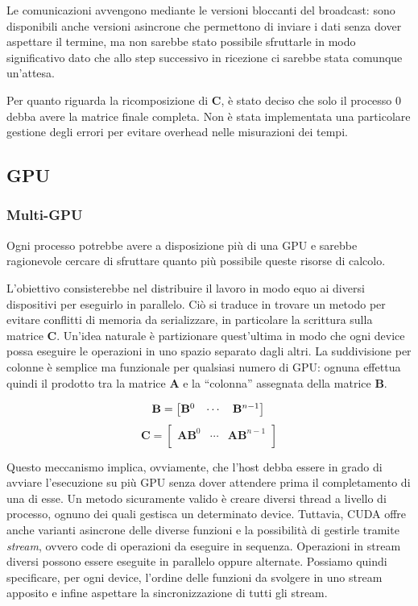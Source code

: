 \documentclass[a4paper]{article}
\begin{document}
Le comunicazioni avvengono mediante le versioni bloccanti del broadcast: sono disponibili anche versioni asincrone che permettono di inviare i dati senza dover aspettare il termine, ma non sarebbe stato possibile sfruttarle in modo significativo dato che allo step successivo in ricezione ci sarebbe stata comunque un'attesa.

Per quanto riguarda la ricomposizione di $\mathbf{C}$, è stato deciso che solo il processo 0 debba avere la matrice finale completa.
Non è stata implementata una particolare gestione degli errori per evitare overhead nelle misurazioni dei tempi.

\subsection{GPU}
\subsubsection{Multi-GPU}
Ogni processo potrebbe avere a disposizione più di una GPU e sarebbe ragionevole cercare di sfruttare quanto più possibile queste risorse di calcolo.

L'obiettivo consisterebbe nel distribuire il lavoro in modo equo ai diversi dispositivi per eseguirlo in parallelo. Ciò si traduce in trovare un metodo per evitare conflitti di memoria da serializzare, in particolare la scrittura sulla matrice $\mathbf{C}$. Un'idea naturale è partizionare quest'ultima in modo che ogni device possa eseguire le operazioni in uno spazio separato dagli altri.
La suddivisione per colonne è semplice ma funzionale per qualsiasi numero di GPU: ognuna effettua quindi il prodotto tra la matrice $\mathbf{A}$ e la ``colonna'' assegnata della matrice $\mathbf{B}$.

$$
    \mathbf{B}=
    \begin{bmatrix}
        \mathbf{B}^{0} & \cdots & \mathbf{B}^{n - 1} \\
    \end{bmatrix}\\
$$
$$
    \mathbf{C}=
    \begin{bmatrix}
        \mathbf{A}\mathbf{B}^0 & \cdots & \mathbf{A}\mathbf{B}^{n-1} \\
    \end{bmatrix}
$$

Questo meccanismo implica, ovviamente, che l'host debba essere in grado di avviare l'esecuzione su più GPU senza dover attendere prima il completamento di una di esse.
Un metodo sicuramente valido è creare diversi thread a livello di processo, ognuno dei quali gestisca un determinato device.
Tuttavia, CUDA offre anche varianti asincrone delle diverse funzioni e la possibilità di gestirle tramite \textit{stream}, ovvero code di operazioni da eseguire in sequenza. Operazioni in stream diversi possono essere eseguite in parallelo oppure alternate.
Possiamo quindi specificare, per ogni device, l'ordine delle funzioni da svolgere in uno stream apposito e infine aspettare la sincronizzazione di tutti gli stream.
\end{document}
